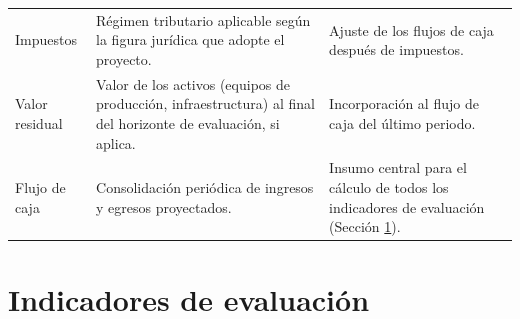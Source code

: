 \documentclass[11pt,a4paper]{article}
\begin{document}
\begin{longtable}{L{3.2cm}L{5.6cm}L{5.6cm}}
Impuestos & Régimen tributario aplicable según la figura jurídica que adopte el proyecto. & Ajuste de los flujos de caja después de impuestos.\\
Valor residual & Valor de los activos (equipos de producción, infraestructura) al final del horizonte de evaluación, si aplica. & Incorporación al flujo de caja del último periodo.\\
Flujo de caja & Consolidación periódica de ingresos y egresos proyectados. & Insumo central para el cálculo de todos los indicadores de evaluación (Sección \ref{sec:indicadores}).\\
\bottomrule
\end{longtable}

\section{Indicadores de evaluación}
\label{sec:indicadores}
\end{document}
